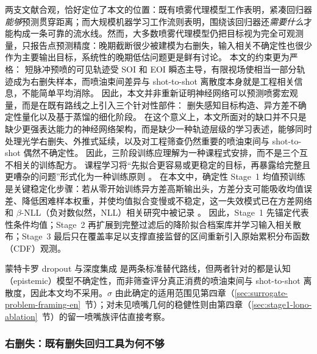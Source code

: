 两支文献合观，恰好定位了本文的位置：既有喷雾代理模型工作表明，紧凑回归器\emph{能够}预测贯穿距离；而大规模机器学习工作流则表明，围绕该回归器还\emph{需要什么}才能构成一条可靠的流水线。然而，大多数喷雾代理模型仍把目标视为完全可观测量，只报告点预测精度：晚期截断很少被建模为右删失，输入相关不确定性也很少作为主要输出目标，系统性的晚期低估问题更是鲜有讨论。
本文的约束更为严格：
短脉冲预喷的可见轨迹受 SOI 和 EOI 瞬态主导，有限视场使相当一部分轨迹成为右删失样本，而喷油束间差异与 shot-to-shot 离散度本身就是工程相关信息，不能简单平均消除。
因此，本文并非重新证明神经网络可以预测喷雾宏观量，而是在既有路线之上引入三个针对性部件：
删失感知目标构造、异方差不确定性量化以及基于蒸馏的细化阶段。
在这个意义上，本文所面对的缺口并不只是缺少更强表达能力的神经网络架构，而是缺少一种轨迹层级的学习表述，能够同时处理光学右删失、外推式延续，以及对工程筛查仍然重要的喷油束间与 shot-to-shot 偶然不确定性。
因此，三阶段训练应理解为一种课程式安排，而不是三个互不相关的训练配方。
课程学习将``先拟合更容易或更稳定的目标，再暴露给完整且更嘈杂的问题''形式化为一种训练原则 \cite{BengioCurriculumLearning2009}。
在本文中，确定性 Stage~1 均值预训练是关键稳定化步骤：若从零开始训练异方差高斯输出头，方差分支可能吸收均值误差、降低困难样本权重，并使均值拟合变慢或不稳定，这一失效模式已在方差网络和 \(\beta\)-NLL（负对数似然，NLL）相关研究中被记录 \cite{Detlefsen2019VarianceNetworks,Seitzer2022PitfallsHeteroscedastic}。
因此，Stage~1 先锚定代表性条件均值；Stage~2 再扩展到完整过滤后的降阶拟合档案库并学习输入相关散布；Stage~3 最后只在覆盖率足以支撑直接监督的区间重新引入原始累积分布函数（CDF）观测。

蒙特卡罗 dropout \cite{GalGhahramani2016Dropout} 与深度集成 \cite{LakshminarayananEnsembles2017} 是两条标准替代路线，但两者针对的都是认知（epistemic）模型不确定性，而非筛查评分真正消费的喷油束间与 shot-to-shot 离散度，因此本文均不采用。\(\sigma\) 由此确定的适用范围见第四章（\ref{sec:surrogate-problem-framing-en}~节）；对未见喷嘴几何的稳健性则由第四章（\ref{sec:stage1-lono-ablation}~节）的留一喷嘴族评估直接考察。

\subsubsection{右删失：既有删失回归工具为何不够}

